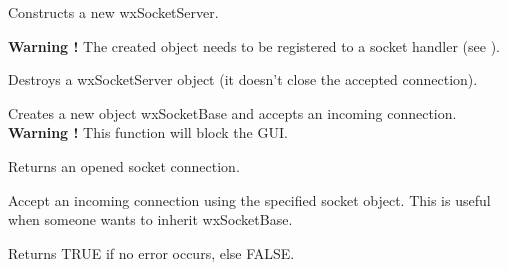 Constructs a new wxSocketServer.

{\bf Warning !} The created object needs to be registered to a socket handler
(see ).




%
%


Destroys a wxSocketServer object (it doesn't close the accepted connection).

%
%


Creates a new object wxSocketBase and accepts an incoming connection. {\bf Warning !} This function will block the GUI.


Returns an opened socket connection.



%
%
\label{wxsocketserveracceptwith}


Accept an incoming connection using the specified socket object.
This is useful when someone wants to inherit wxSocketBase.




Returns TRUE if no error occurs, else FALSE.

